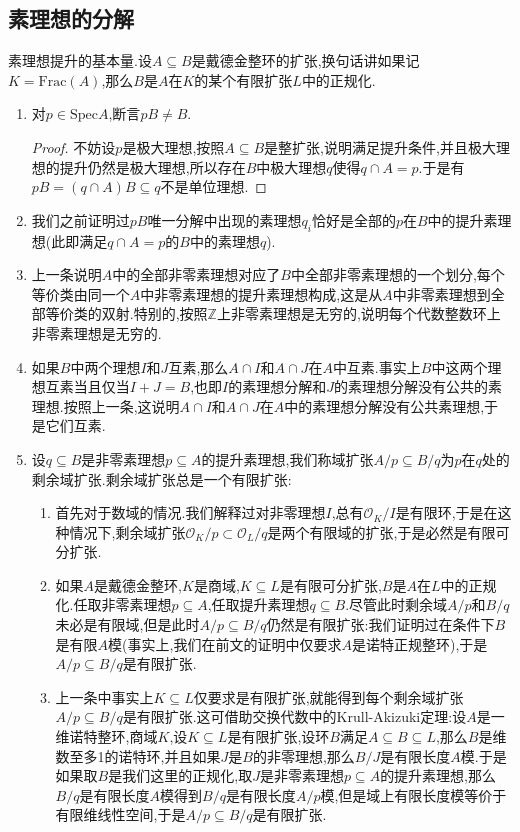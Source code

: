 \subsection{素理想的分解}

素理想提升的基本量.设$A\subseteq B$是戴德金整环的扩张,换句话讲如果记$K=\mathrm{Frac}(A)$,那么$B$是$A$在$K$的某个有限扩张$L$中的正规化.
\begin{enumerate}
	\item 对$p\in\mathrm{Spec}A$,断言$pB\not=B$.
	\begin{proof}
		
		不妨设$p$是极大理想,按照$A\subseteq B$是整扩张,说明满足提升条件,并且极大理想的提升仍然是极大理想,所以存在$B$中极大理想$q$使得$q\cap A=p$.于是有$pB=(q\cap A)B\subseteq q$不是单位理想.
	\end{proof}
	\item 我们之前证明过$pB$唯一分解中出现的素理想$q_i$恰好是全部的$p$在$B$中的提升素理想(此即满足$q\cap A=p$的$B$中的素理想$q$).
	\item 上一条说明$A$中的全部非零素理想对应了$B$中全部非零素理想的一个划分,每个等价类由同一个$A$中非零素理想的提升素理想构成,这是从$A$中非零素理想到全部等价类的双射.特别的,按照$\mathbb{Z}$上非零素理想是无穷的,说明每个代数整数环上非零素理想是无穷的.
	\item 如果$B$中两个理想$I$和$J$互素,那么$A\cap I$和$A\cap J$在$A$中互素.事实上$B$中这两个理想互素当且仅当$I+J=B$,也即$I$的素理想分解和$J$的素理想分解没有公共的素理想.按照上一条,这说明$A\cap I$和$A\cap J$在$A$中的素理想分解没有公共素理想,于是它们互素.
	\item 设$q\subseteq B$是非零素理想$p\subseteq A$的提升素理想,我们称域扩张$A/p\subseteq B/q$为$p$在$q$处的剩余域扩张.剩余域扩张总是一个有限扩张:
	\begin{enumerate}
		\item 首先对于数域的情况.我们解释过对非零理想$I$,总有$\mathscr{O}_K/I$是有限环,于是在这种情况下,剩余域扩张$\mathscr{O}_K/p\subset\mathscr{O}_L/q$是两个有限域的扩张,于是必然是有限可分扩张.
		\item 如果$A$是戴德金整环,$K$是商域,$K\subseteq L$是有限可分扩张,$B$是$A$在$L$中的正规化.任取非零素理想$p\subseteq A$,任取提升素理想$q\subseteq B$.尽管此时剩余域$A/p$和$B/q$未必是有限域,但是此时$A/p\subseteq B/q$仍然是有限扩张:我们证明过在条件下$B$是有限$A$模(事实上,我们在前文的证明中仅要求$A$是诺特正规整环),于是$A/p\subseteq B/q$是有限扩张.
		\item 上一条中事实上$K\subseteq L$仅要求是有限扩张,就能得到每个剩余域扩张$A/p\subseteq B/q$是有限扩张.这可借助交换代数中的Krull-Akizuki定理:设$A$是一维诺特整环,商域$K$,设$K\subseteq L$是有限扩张,设环$B$满足$A\subseteq B\subseteq L$,那么$B$是维数至多1的诺特环,并且如果$J$是$B$的非零理想,那么$B/J$是有限长度$A$模.于是如果取$B$是我们这里的正规化,取$J$是非零素理想$p\subseteq A$的提升素理想,那么$B/q$是有限长度$A$模得到$B/q$是有限长度$A/p$模,但是域上有限长度模等价于有限维线性空间,于是$A/p\subseteq B/q$是有限扩张.

\end{enumerate}
\end{enumerate}
